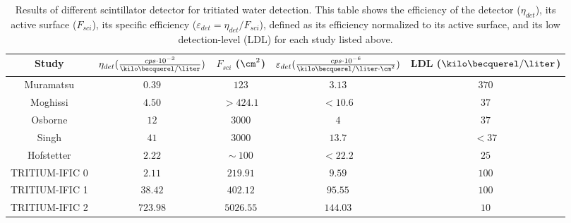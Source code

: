 \begin{table}[htbp]
\begin{center}
\begin{tabular}{|c|c|c|c|c|}
\hline
Study & \parbox{5.5em}{\centering $\eta_{det}(\frac{cps \cdot{} 10^{-3}}{\kilo\becquerel/\liter})$}  & \parbox{4.5em}{\centering $F_{sci}$ ($\cm^2$)}  & \parbox{6.5em}{\centering $\varepsilon_{det}(\frac{cps \cdot{} 10^{-6}}{\kilo\becquerel/ \liter \cdot{} \cm^2})$} & LDL ($\kilo\becquerel / \liter$)\\
\hline \hline \hline
Muramatsu & $0.39$ & $123$ & $3.13$ & $370$ \\ \hline
Moghissi & $4.50$ & $>424.1$ & $<10.6$ & $37$ \\\hline
Osborne & $12$ & $3000$ & $4$ & $37$ \\ \hline
Singh & $41$ & $3000$ & $13.7$ & $<37$ \\ \hline
Hofstetter & $2.22$ & $\sim~100$ & $<22.2$ & $25$ \\ \hline
TRITIUM-IFIC 0 & $2.11$ & $219.91$ & $9.59$ & $100$ \\ \hline
TRITIUM-IFIC 1 & $38.42$ & $402.12$ & $95.55$ & $100$ \\ \hline
TRITIUM-IFIC 2 & $723.98$ & $5026.55$ & $144.03$ & $10$ \\ \hline
\end{tabular}
\caption{Results of different scintillator detector for tritiated water detection. This table shows the efficiency of the detector ($\eta_{det}$), its active surface ($F_{sci}$), its specific efficiency ($\varepsilon_{det}=\eta_{det}/F_{sci}$), defined as its efficiency normalized to its active surface, and its low detection-level (LDL) for each study listed above.}
\label{tab:ComparisonResults}
\end{center}
\end{table}
